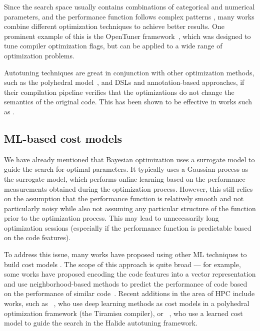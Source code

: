 Since the search space usually contains combinations of categorical and numerical parameters, and the performance function follows complex patterns , many works combine different optimization techniques to achieve better results. One prominent example of this is the OpenTuner framework~\cite{ansel2014opentuner}, which was designed to tune compiler optimization flags, but can be applied to a wide range of optimization problems.

Autotuning techniques are great in conjunction with other optimization methods, such as the polyhedral model~, and DSLs and annotation-based approaches, if their compilation pipeline verifies that the optimizations do not change the semantics of the original code. This has been shown to be effective in works such as .


\subsection{ML-based cost models}\label{sec:ml-based-cost-models}



We have already mentioned that Bayesian optimization uses a surrogate model to guide the search for optimal parameters. It typically uses a Gaussian process as the surrogate model, which performs online learning based on the performance measurements obtained during the optimization process. However, this still relies on the assumption that the performance function is relatively smooth and not particularly noisy while also not assuming any particular structure of the function prior to the optimization process. This may lead to unnecessarily long optimization sessions (especially if the performance function is predictable based on the code features).

To address this issue, many works have proposed using other ML techniques to build cost models . The scope of this approach is quite broad --- for example, some works have proposed encoding the code features into a vector representation and use neighborhood-based methods to predict the performance of code based on the performance of similar code~. Recent additions in the area of HPC include works, such as \citeauthor{baghdadi2021deep}~\cite{baghdadi2021deep}, who use deep learning methods as cost models in a polyhedral optimization framework (the Tiramisu compiler), or \citeauthor{adams2019learning}~\cite{adams2019learning}, who use a learned cost model to guide the search in the Halide autotuning framework.

